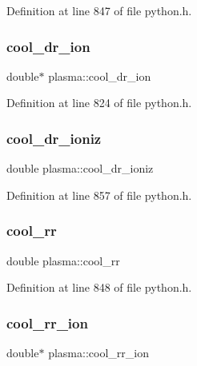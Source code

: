 Definition at line 847 of file python.\+h.

\mbox{\label{structplasma_ad69c6b875d8b97df4e10569a06085107}} 
\subsubsection{\texorpdfstring{cool\+\_\+dr\+\_\+ion}{cool\_dr\_ion}}
{\footnotesize\ttfamily double$\ast$ plasma\+::cool\+\_\+dr\+\_\+ion}



Definition at line 824 of file python.\+h.

\mbox{\label{structplasma_a5a044a5991244d771cf0937a322bff4f}} 
\subsubsection{\texorpdfstring{cool\+\_\+dr\+\_\+ioniz}{cool\_dr\_ioniz}}
{\footnotesize\ttfamily double plasma\+::cool\+\_\+dr\+\_\+ioniz}



Definition at line 857 of file python.\+h.

\mbox{\label{structplasma_a7bafaea3d058631613ebd1c8a8b8eacc}} 
\subsubsection{\texorpdfstring{cool\+\_\+rr}{cool\_rr}}
{\footnotesize\ttfamily double plasma\+::cool\+\_\+rr}



Definition at line 848 of file python.\+h.

\mbox{\label{structplasma_a0d74b5ee435184a0bf1f2dbdecc16a2d}} 
\subsubsection{\texorpdfstring{cool\+\_\+rr\+\_\+ion}{cool\_rr\_ion}}
{\footnotesize\ttfamily double$\ast$ plasma\+::cool\+\_\+rr\+\_\+ion}



